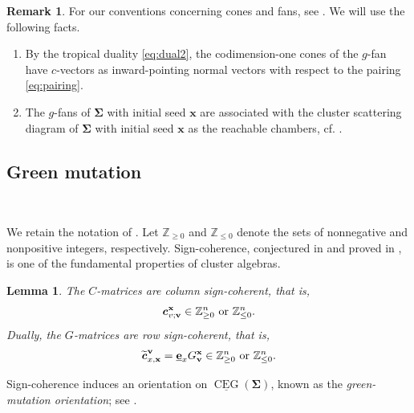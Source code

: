 \documentclass[11pt,reqno]{amsart}
\theoremstyle{plain}
\newtheorem{lemma}[theorem]{Lemma}
\theoremstyle{definition}
\newtheorem{remark}[theorem]{Remark}
\numberwithin{equation}{section}
\newcommand\ZZ{\mathbb{Z}}
\newcommand\<{\langle}
\renewcommand\>{\rangle}
\newcommand{\CEG}{\operatorname{CEG}} %
\newcommand{\uCEG}{\underline{\CEG}} %
\def\vv{\mathbf{v}}
\newcommand{\bfit}[1]{\textbf{\textit{#1}}}
\newcommand{\ubf}[1]{\underline{\mathbf{#1}}}
\def\seeds{\mathbf{\Sigma}}
\def\xx{\mathbf{x}}%
\def\cvec{\bfit{c}}
\def\Gmat{{G}}
\def\ZZp{\ZZ_{\ge0}}
\def\ZZm{\ZZ_{\le0}}
\begin{document}
\begin{remark}\label{rem:fan-CSD}
For our conventions concerning cones and fans, see \cite[Part~II, Sec.~2]{Nak}. We will use the following facts.
\begin{enumerate}
    \item By the tropical duality \eqref{eq:dual2}, the codimension-one cones of the $g$-fan have $c$-vectors as inward-pointing normal vectors with respect to the pairing \eqref{eq:pairing}.
    \item The $g$-fans of $\seeds$ with initial seed $\xx$ are associated with the cluster scattering diagram of $\seeds$ with initial seed $\xx$ as the reachable chambers, cf. \cite[Lem.~2.10]{GHKK18}.
\end{enumerate}
\end{remark}

\subsection{Green mutation}\

We retain the notation of .
Let $\ZZp$ and $\ZZm$ denote the sets of nonnegative and nonpositive integers, respectively.
Sign-coherence, conjectured in \cite[Conj.~6.13]{FZ07} and proved in \cite{GHKK18}, is one of the fundamental properties of cluster algebras.

\begin{lemma}\cite[Cor.~5.5]{GHKK18}\label{lem:sc}
The $C$-matrices are \emph{column sign-coherent}, that is,
\begin{gather}\label{eq:c-sc}
\cvec^{\xx}_{v;\vv}\in\ZZp^n~\text{or}~\ZZm^n.
\end{gather}
Dually, the $G$-matrices are \emph{row sign-coherent}, that is,
\begin{gather}\label{eq:g-sc}
    \widetilde{\cvec}^\vv_{x,\xx}=\ubf{e}_{x} \Gmat^\xx_\vv\in\ZZp^n~\text{or}~\ZZm^n.
\end{gather}
\end{lemma}

Sign-coherence induces an orientation on $\uCEG(\seeds)$, known as the \emph{green-mutation orientation}; see \cite[\S5]{Ke2}. %
\end{document}
